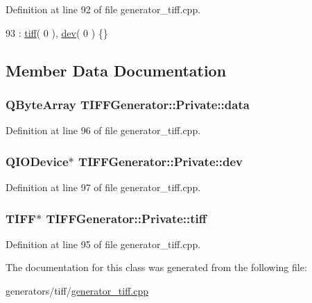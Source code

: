 Definition at line 92 of file generator\+\_\+tiff.\+cpp.


\begin{DoxyCode}
93           : \hyperlink{classTIFFGenerator_1_1Private_abe0f02dd2a2177e43a18938d465ef328}{tiff}( 0 ), \hyperlink{classTIFFGenerator_1_1Private_af7d4bd0a5182c81313f551c9648c7a8d}{dev}( 0 ) \{\}
\end{DoxyCode}


\subsection{Member Data Documentation}
\hypertarget{classTIFFGenerator_1_1Private_a7deeb49c28cbb031066e1656b7febf6a}{
\subsubsection[{data}]{\setlength{\rightskip}{0pt plus 5cm}Q\+Byte\+Array T\+I\+F\+F\+Generator\+::\+Private\+::data}}\label{classTIFFGenerator_1_1Private_a7deeb49c28cbb031066e1656b7febf6a}


Definition at line 96 of file generator\+\_\+tiff.\+cpp.

\hypertarget{classTIFFGenerator_1_1Private_af7d4bd0a5182c81313f551c9648c7a8d}{
\subsubsection[{dev}]{\setlength{\rightskip}{0pt plus 5cm}Q\+I\+O\+Device$\ast$ T\+I\+F\+F\+Generator\+::\+Private\+::dev}}\label{classTIFFGenerator_1_1Private_af7d4bd0a5182c81313f551c9648c7a8d}


Definition at line 97 of file generator\+\_\+tiff.\+cpp.

\hypertarget{classTIFFGenerator_1_1Private_abe0f02dd2a2177e43a18938d465ef328}{
\subsubsection[{tiff}]{\setlength{\rightskip}{0pt plus 5cm}T\+I\+F\+F$\ast$ T\+I\+F\+F\+Generator\+::\+Private\+::tiff}}\label{classTIFFGenerator_1_1Private_abe0f02dd2a2177e43a18938d465ef328}


Definition at line 95 of file generator\+\_\+tiff.\+cpp.



The documentation for this class was generated from the following file\+:\begin{DoxyCompactItemize}
\item 
generators/tiff/\hyperlink{generator__tiff_8cpp}{generator\+\_\+tiff.\+cpp}\end{DoxyCompactItemize}
